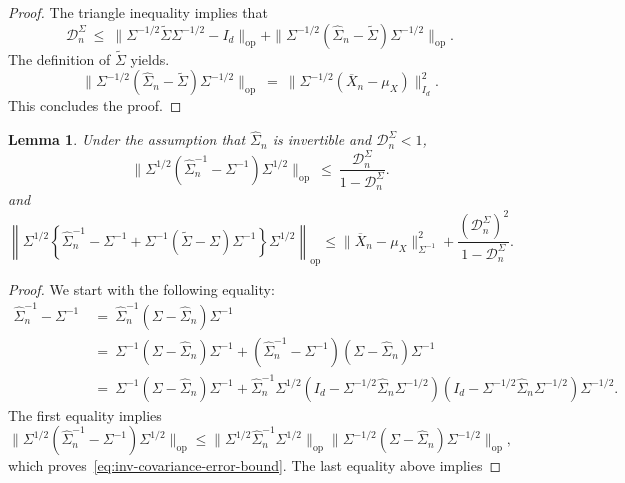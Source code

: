 \documentclass[11pt]{article}
\newtheorem{lemma}[theorem]{Lemma}
\begin{document}
\begin{appendices}
\begin{proof}
The triangle inequality implies that
\[
\mathcal{D}_n^{\Sigma} ~\le~ \|\Sigma^{-1/2}\widetilde{\Sigma}\Sigma^{-1/2} - I_d\|_{\mathrm{op}} + \|\Sigma^{-1/2}(\widehat{\Sigma}_n - \widetilde{\Sigma})\Sigma^{-1/2}\|_{\mathrm{op}}. 
\]
The definition of $\widetilde{\Sigma}$ yields.
\[
\|\Sigma^{-1/2}(\widehat{\Sigma}_n - \widetilde{\Sigma})\Sigma^{-1/2}\|_{\mathrm{op}} ~=~ \|\Sigma^{-1/2}(\overline{X}_n - \mu_X)\|_{I_d}^2.
\] 
This concludes the proof.
\end{proof}
\begin{lemma}\label{lemma:linear-expansion-inv-covariance}
Under the assumption that $\widehat{\Sigma}_n$ is invertible and $\mathcal{D}_n^{\Sigma} <1$,
\begin{equation}\label{eq:inv-covariance-error-bound}
\|\Sigma^{1/2}(\widehat{\Sigma}_n^{-1} - \Sigma^{-1})\Sigma^{1/2}\|_{\mathrm{op}} ~\le~ \frac{\mathcal{D}_n^{\Sigma}}{1 - \mathcal{D}_n^{\Sigma}}. 
\end{equation}
and
\begin{equation}\label{eq:final-linear-expansion-inv-covariance}
\left\|\Sigma^{1/2}\left\{\widehat{\Sigma}_n^{-1} - \Sigma^{-1} + \Sigma^{-1}(\widetilde{\Sigma} - \Sigma)\Sigma^{-1}\right\}\Sigma^{1/2}\right\|_{\mathrm{op}} \le \|\overline{X}_n - \mu_X\|^2_{\Sigma^{-1}} + \frac{(\mathcal{D}_n^{\Sigma})^2}{1 - \mathcal{D}_n^{\Sigma}}.
\end{equation}
\end{lemma}
\begin{proof}
We start with the following equality:
\begin{align*}
\widehat{\Sigma}_n^{-1} - \Sigma^{-1} ~&=~ \widehat{\Sigma}_n^{-1}(\Sigma - \widehat{\Sigma}_n)\Sigma^{-1}\\
~&=~ \Sigma^{-1}(\Sigma - \widehat{\Sigma}_n)\Sigma^{-1} + (\widehat{\Sigma}_n^{-1} - \Sigma^{-1})(\Sigma - \widehat{\Sigma}_n)\Sigma^{-1}\\
~&=~ \Sigma^{-1}(\Sigma - \widehat{\Sigma}_n)\Sigma^{-1} + \widehat{\Sigma}_n^{-1}\Sigma^{1/2}(I_d - \Sigma^{-1/2}\widehat{\Sigma}_n\Sigma^{-1/2})(I_d - \Sigma^{-1/2}\widehat{\Sigma}_n\Sigma^{-1/2})\Sigma^{-1/2}.
\end{align*}
The first equality implies
\[
\|\Sigma^{1/2}(\widehat{\Sigma}_n^{-1} - \Sigma^{-1})\Sigma^{1/2}\|_{\mathrm{op}} \le \|\Sigma^{1/2}\widehat{\Sigma}_n^{-1}\Sigma^{1/2}\|_{\mathrm{op}}\|\Sigma^{-1/2}(\Sigma - \widehat{\Sigma}_n)\Sigma^{-1/2}\|_{\mathrm{op}},
\]
which proves~\eqref{eq:inv-covariance-error-bound}. The last equality above implies

\end{proof}
\end{appendices}
\end{document}
